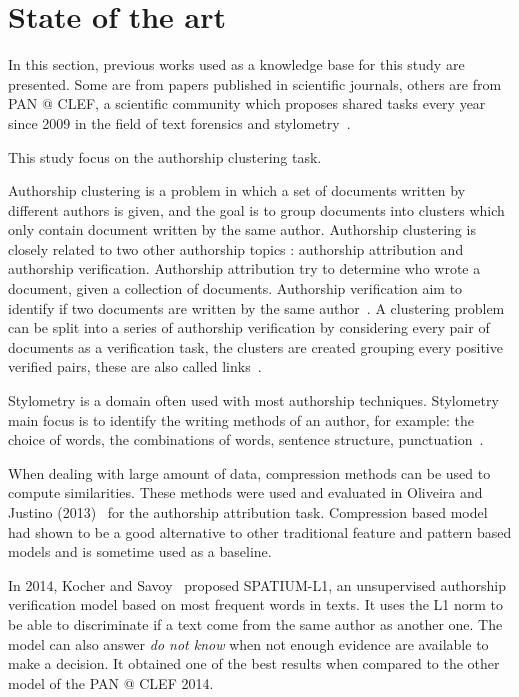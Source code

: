 \chapter{State of the art \label{sec:state_of_the_art}}

In this section, previous works used as a knowledge base for this study are presented.
Some are from papers published in scientific journals, others are from PAN @ CLEF, a scientific community which proposes shared tasks every year since 2009 in the field of text forensics and stylometry~\cite{pan_webis}.

This study focus on the authorship clustering task.

Authorship clustering is a problem in which a set of documents written by different authors is given, and the goal is to group documents into clusters which only contain document written by the same author.
Authorship clustering is closely related to two other authorship topics : authorship attribution and authorship verification.
Authorship attribution try to determine who wrote a document, given a collection of documents.
Authorship verification aim to identify if two documents are written by the same author~\cite{pan11_verif}.
A clustering problem can be split into a series of authorship verification by considering every pair of documents as a verification task, the clusters are created grouping every positive verified pairs, these are also called links~\cite{pan16_clustering_site}.

Stylometry is a domain often used with most authorship techniques.
Stylometry main focus is to identify the writing methods of an author, for example: the choice of words, the combinations of words, sentence structure, punctuation~\cite{savoy_stylo}.

When dealing with large amount of data, compression methods can be used to compute similarities.
These methods were used and evaluated in Oliveira and Justino (2013)~\cite{comparing_compression} for the authorship attribution task.
Compression based model had shown to be a good alternative to other traditional feature and pattern based models and is sometime used as a baseline.

In 2014, Kocher and Savoy~\cite{kocher_linking} proposed SPATIUM-L1, an unsupervised authorship verification model based on most frequent words in texts.
It uses the L1 norm to be able to discriminate if a text come from the same author as another one.
The model can also answer \textit{do not know} when not enough evidence are available to make a decision.
It obtained one of the best results when compared to the other model of the PAN @ CLEF 2014.

